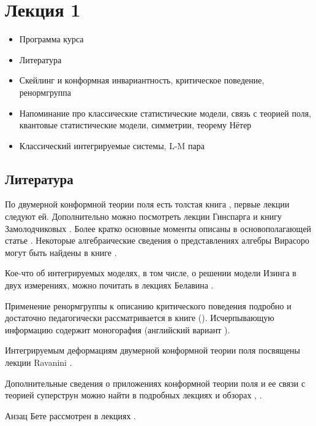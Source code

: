 \documentclass[a4paper,12pt]{article}
\theoremstyle{definition}
\theoremstyle{definition}
\theoremstyle{definition}
\begin{document}
\section{Лекция 1}
\label{sec:-1}

  \begin{itemize}
  \item Программа курса
  \item Литература
  \item Скейлинг и конформная инвариантность, критическое поведение, ренормгруппа
  \item Напоминание про классические статистические модели, связь с теорией поля, квантовые
    статистические модели, симметрии, теорему Нётер
  \item Классический интегрируемые системы, L-M пара
  \end{itemize}

\subsection{Литература}
\label{sec:literature}

По двумерной конформной теории поля есть толстая книга \cite{difrancesco1997cft}, первые лекции
следуют ей. Дополнительно можно посмотреть лекции Гинспарга \cite{Ginsparg:1988ui} и книгу
Замолодчиковых \cite{zamolodchikov1989rus,zamolodchikov1989conformal}. Более кратко основные моменты
описаны в основополагающей статье \cite{belavin1984ics}. Некоторые алгебраические сведения о
представлениях алгебры Вирасоро могут быть найдены в книге \cite{golod2001}.

Кое-что об интегрируемых моделях, в том числе, о решении модели Изинга в двух измерениях, можно
почитать в лекциях Белавина \cite{belavin2001lect}.

Применение ренормгруппы к описанию критического поведения подробно и достаточно педагогически
рассматривается в книге \cite{ma1980} (\cite{ma2000modern}). Исчерпывающую информацию содержит
моногорафия \cite{vasiliev1998} (английский вариант \cite{Vasilev:1027193}). 

Интегрируемым деформациям двумерной конформной теории поля посвящены лекции Ravanini
\cite{Ravanini:2000st}.

Дополнительные сведения о приложениях конформной теории поля и ее связи с теорией суперструн можно
найти в подробных лекциях \cite{springerlink:10.1134/S1063778810050108} и обзорах
\cite{Walton:1999xc}, \cite{gaberdiel2000icf}.

Анзац Бете рассмотрен в лекциях \cite{faddeev1996algebraic}. 
\end{document}
